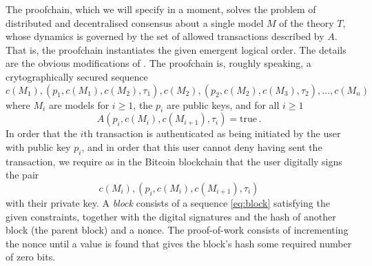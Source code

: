 \documentclass[english,letter paper,12pt,reqno]{article}
\theoremstyle{example}
\begin{document}

The proofchain, which we will specify in a moment, solves the problem of distributed and decentralised consensus about a single model $M$ of the theory $T$, whose dynamics is governed by the set of allowed transactions described by $A$. That is, the proofchain instantiates the given emergent logical order. The details are the obvious modifications of \cite{satoshi}. The proofchain is, roughly speaking, a crytographically secured sequence
\begin{equation}\label{eq:block}
c(M_1), (p_1, c(M_1), c(M_2), \tau_1), c(M_2), (p_2, c(M_2),c(M_3),\tau_2), \ldots, c(M_n)
\end{equation}
where $M_i$ are models for $i \ge 1$, the $p_i$ are public keys, and for all $i \ge 1$
\[
A(p_i, c(M_i), c(M_{i+1}), \tau_i) = \textrm{true}\,.
\]
In order that the $i$th transaction is authenticated as being initiated by the user with public key $p_i$, and in order that this user cannot deny having sent the transaction, we require as in the Bitcoin blockchain that the user digitally signs the pair
\[
c(M_i), (p_i, c(M_i), c(M_{i+1}), \tau_i)
\]
with their private key. A \emph{block} consists of a sequence \eqref{eq:block} satisfying the given constraints, together with the digital signatures and the hash of another block (the parent block) and a nonce. The proof-of-work consists of incrementing the nonce until a value is found that gives the block's hash some required number of zero bits.
\end{document}
